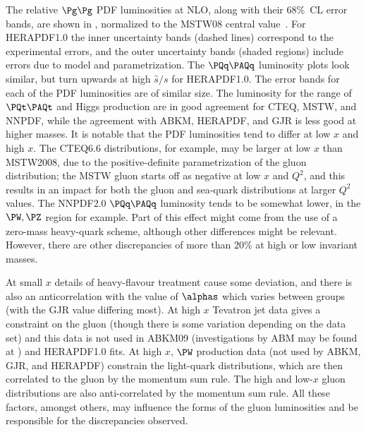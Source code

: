 The relative $\Pg\Pg$ PDF luminosities at NLO, along with their $68\%$~CL
error bands, are shown in ,
normalized to the MSTW08 central value~\cite{Watt}.
For HERAPDF1.0 the inner uncertainty bands (dashed lines) 
correspond to the experimental errors, and the
outer uncertainty bands (shaded regions) include errors due to model and
parametrization. The $\PQq\PAQq$ luminosity plots \cite{Watt} look 
similar, but turn upwards at high $\hat s/s$ for HERAPDF1.0. The error 
bands for each of the PDF
luminosities are of similar size. The luminosity  for the range of 
$\PQt\PAQt$ and Higgs production  are in
good agreement for CTEQ, MSTW, and NNPDF, while the agreement
with ABKM, HERAPDF, and GJR is less good at higher masses. 
It is notable that the PDF
luminosities tend to differ at low $x$ and high $x$. 
The CTEQ6.6 distributions, for
example, may be larger at low $x$ than MSTW2008, due to the
positive-definite parametrization of the gluon distribution; the MSTW
gluon starts off as negative at low $x$ and $Q^2$, and this results in an
impact for both the gluon and sea-quark distributions at larger $Q^2$
values. The NNPDF2.0 $\PQq\PAQq$ luminosity tends to be somewhat lower,
in the $\PW,\PZ$ region for example.  Part of this effect might come from
the use of a zero-mass heavy-quark scheme, although other differences 
might be relevant. However, there are other discrepancies of more than $20\%$
at high or low invariant masses. 

At small $x$ details of heavy-flavour 
treatment cause some deviation, and there is also an 
anticorrelation with the value of $\alphas$ which varies 
between groups (with the GJR value differing most). 
At high $x$ Tevatron jet data gives a constraint on the gluon 
(though there is some variation depending on the data set) 
and this data is not used in ABKM09 (investigations by ABM may be found at 
) and 
HERAPDF1.0 fits. At high $x$, $\PW$ production data (not used by ABKM,
GJR, and HERAPDF) 
constrain the light-quark distributions, which are then correlated to
the gluon by the momentum sum rule.
 The high and low-$x$ gluon distributions are also 
anti-correlated by the momentum sum rule. All these factors, amongst
others, may influence the forms of the gluon luminosities and be
responsible for the discrepancies observed.
   
